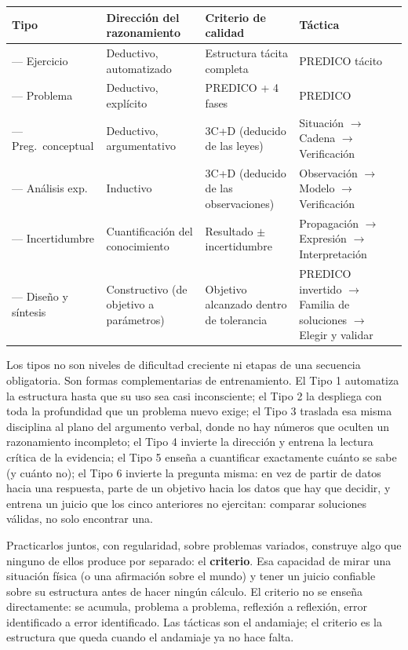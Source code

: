 \documentclass[11pt]{book}
\begin{document}
\medskip
\begin{center}
\footnotesize
\begin{tabular}{>{\raggedright\arraybackslash}p{1.9cm}>{\raggedright\arraybackslash}p{3.0cm}>{\raggedright\arraybackslash}p{4.4cm}>{\raggedright\arraybackslash}p{4.2cm}}
\hline
\textbf{Tipo} & \textbf{Dirección del razonamiento} & \textbf{Criterio de calidad} & \textbf{Táctica} \\
\hline
1 --- Ejercicio          & Deductivo, automatizado     & Estructura tácita completa          & PREDICO tácito \\
2 --- Problema           & Deductivo, explícito        & PREDICO + 4 fases                   & PREDICO \\
3 --- Preg.\ conceptual  & Deductivo, argumentativo    & 3C+D (deducido de las leyes)        & Situación $\to$ Cadena $\to$ Verificación \\
4 --- Análisis exp.      & Inductivo                   & 3C+D (deducido de las observaciones)& Observación $\to$ Modelo $\to$ Verificación \\
5 --- Incertidumbre      & Cuantificación del conocimiento & Resultado $\pm$ incertidumbre   & Propagación $\to$ Expresión $\to$ Interpretación \\
6 --- Diseño y síntesis  & Constructivo (de objetivo a parámetros) & Objetivo alcanzado dentro de tolerancia & PREDICO invertido $\to$ Familia de soluciones $\to$ Elegir y validar \\
\hline
\end{tabular}
\end{center}

\medskip
Los tipos no son niveles de dificultad creciente ni etapas de una secuencia obligatoria. Son formas complementarias de entrenamiento. El Tipo 1 automatiza la estructura hasta que su uso sea casi inconsciente; el Tipo 2 la despliega con toda la profundidad que un problema nuevo exige; el Tipo 3 traslada esa misma disciplina al plano del argumento verbal, donde no hay números que oculten un razonamiento incompleto; el Tipo 4 invierte la dirección y entrena la lectura crítica de la evidencia; el Tipo 5 enseña a cuantificar exactamente cuánto se sabe (y cuánto no); el Tipo 6 invierte la pregunta misma: en vez de partir de datos hacia una respuesta, parte de un objetivo hacia los datos que hay que decidir, y entrena un juicio que los cinco anteriores no ejercitan: comparar soluciones válidas, no solo encontrar una.

Practicarlos juntos, con regularidad, sobre problemas variados, construye algo que ninguno de ellos produce por separado: el {\bf criterio}. Esa capacidad de mirar una situación física (o una afirmación sobre el mundo) y tener un juicio confiable sobre su estructura antes de hacer ningún cálculo. El criterio no se enseña directamente: se acumula, problema a problema, reflexión a reflexión, error identificado a error identificado. Las tácticas son el andamiaje; el criterio es la estructura que queda cuando el andamiaje ya no hace falta.
\end{document}
